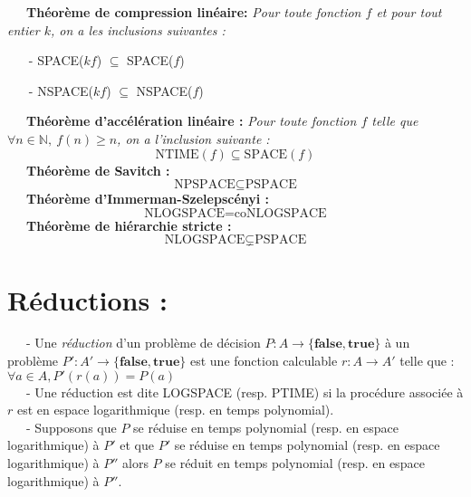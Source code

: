 \documentclass[10pt,a4paper]{article}
\begin{document}
\ \ \ \textbf{Théorème de compression linéaire:} \textit{Pour toute fonction $f$ et pour tout entier $k$, on a les inclusions suivantes :}
\begin{enumerate}
\item[-] SPACE($kf$) $\subseteq$ SPACE($f$)
\item[-] NSPACE($kf$) $\subseteq$ NSPACE($f$)
\end{enumerate}
\ \ \ \textbf{Théorème d'accélération linéaire : } \textit{Pour toute fonction $f$ telle que $\forall n \in \mathbb{N}, \ f(n) \geq n$, on a l'inclusion suivante : }
\[\text{NTIME}(f) \subseteq \text{SPACE}(f)\] 
\ \ \ \textbf{Théorème de Savitch : }
\[\text{NPSPACE} \subseteq \text{PSPACE}\] 
\ \ \ \textbf{Théorème d'Immerman-Szelepscényi : }
\[\text{NLOGSPACE} = \text{coNLOGSPACE}\] 
\ \ \ \textbf{Théorème de hiérarchie stricte : }
\[\text{NLOGSPACE} \subsetneq \text{PSPACE}\] 
\section{Réductions :}
\ \ \ - Une \textit{réduction} d'un problème de décision $P : A \to \{ \textbf{false}, \textbf{true} \}$ à un problème $P' : A' \to \{ \textbf{false}, \textbf{true} \}$ est une fonction calculable $r : A \to A'$ telle que : $\forall a \in A, P'(r(a)) = P(a)$ \\

\ \ \ - Une réduction est dite LOGSPACE (resp. PTIME) si la procédure associée à $r$ est en espace logarithmique (resp. en temps polynomial). \\

\ \ \ - Supposons que $P$ se réduise en temps polynomial (resp. en espace logarithmique) à $P'$ et que $P'$ se réduise en temps polynomial (resp. en espace logarithmique) à $P''$ alors $P$ se réduit en temps polynomial (resp. en espace logarithmique) à $P''$.
\end{document}
